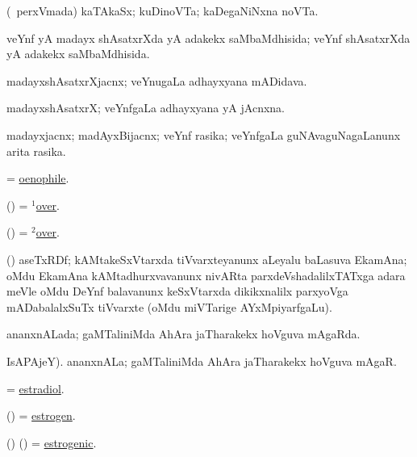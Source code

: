 \bentry
{}
\gl{\nA}
\expl{\F}
\bmng
(\kanmu\ perxVmada) kaTAkaSx; kuDinoVTa; kaDegaNiNxna noVTa. 
\emng
\eentry

\bentry
{}
\gl{\gu}
\bmng
veYnf yA madayx shAsatxrXda yA adakekx saMbaMdhisida; veYnf shAsatxrXda yA adakekx saMbaMdhisida. 
\emng
\eentry

\bentry
{}
\gl{\nA}
\bmng
madayxshAsatxrXjacnx; veYnugaLa adhayxyana mADidava. 
\emng
\eentry

\bentry
{}
\gl{\nA}
\bmng
madayxshAsatxrX; veYnfgaLa adhayxyana yA jAcnxna. 
\emng
\eentry

\bentry
{}
\gl{\nA}
\bmng
madayxjacnx; madAyxBijacnx; veYnf rasika; veYnfgaLa guNAvaguNagaLanunx arita rasika. 
\emng
\eentry

\bentry
{}
\gl{\nA}
\bmng
= \hyperlink{oenophile}{oenophile}. 
\emng
\eentry

\bentry
{}
\gl{\kirxvi}
\bmng
(\kAparx) = \hyperlink{over(1)}{$^1$over}. 
\emng
\eentry

\bentry
{}
\gl{\upa}
\bmng
(\kAparx) = \hyperlink{over(2)}{$^2$over}. 
\emng
\eentry

\bentry
{}
\gl{\nA}
\bmng
(\Bwvi) aseTxRDf; kAMtakeSxVtarxda tiVvarxteyanunx aLeyalu baLasuva EkamAna; oMdu EkamAna kAMtadhurxvavanunx nivARta parxdeVshadalilxTATxga adara meVle oMdu DeYnf balavanunx keSxVtarxda dikikxnalilx parxyoVga mADabalalxSuTx tiVvarxte (oMdu miVTarige  AYxMpiyarfgaLu). 
\emng
\eentry

\bentry
{}
\gl{\gu}
\bmng
ananxnALada; gaMTaliniMda AhAra jaTharakekx hoVguva mAgaRda. 
\emng
\eentry

\bentry
{}
\gl{\nA}
IsAPAjeY). \bmng
ananxnALa; gaMTaliniMda AhAra jaTharakekx hoVguva mAgaR. 
\emng
\eentry

\bentry
{}
\gl{\nA}
\bmng
= \hyperref{kandict_e.pdf}{E}{estradiol}{estradiol}. 
\emng
\eentry

\bentry
{}
\gl{\nA}
\bmng
(\birx) = \hyperref{kandict_e.pdf}{E}{estrogen}{estrogen}. 
\emng
\eentry

\bentry
{}
\gl{\gu}
\bmng
(\birx) (\jiVra) = \hyperref{kandict_e.pdf}{E}{estrogenic}{estrogenic}. 
\emng
\eentry

